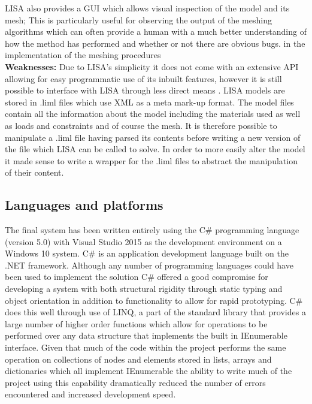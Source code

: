 \noindent
LISA also provides a GUI which allows visual inspection of the model and its mesh; This is particularly useful for observing the output of the meshing algorithms which can often provide a human with a much better understanding of how the method has performed and whether or not there are obvious bugs. in the implementation of the meshing procedures \\ 

\noindent
\textbf{Weaknesses: } Due to LISA’s simplicity it does not come with an extensive API allowing for easy programmatic use of its inbuilt features, however it is still possible to interface with LISA through less direct means \cite{LISAManual}. LISA models are stored in .liml files which use XML as a meta mark-up format. The model files contain all the information about the model including the materials used as well as loads and constraints and of course the mesh. It is therefore possible to manipulate a .liml file having parsed its contents before writing a new version of the file which LISA can be called to solve. In order to more easily alter the model it made sense to write a wrapper  for the .liml files to abstract the manipulation of their content.

\subsection{Languages and platforms}
The final system has been written entirely using the C\# programming language (version 5.0) with Visual Studio 2015 as the development environment on a Windows 10 system. C\# is an application development language built on the .NET framework. Although any number of programming languages could have been used to implement the solution C\# offered a good compromise for developing a system with both structural rigidity through static typing and object orientation in addition to functionality to allow for rapid prototyping. C\# does this well through use of LINQ, a part of the standard library that provides a large number of higher order functions which allow for operations to be performed over any data structure that implements the built in IEnumerable interface. Given that much of the code within the project performs the same operation on collections of nodes and elements stored in lists, arrays and dictionaries which all implement IEnumerable the ability to write much of the project using this capability dramatically reduced the number of errors encountered and increased development speed.


